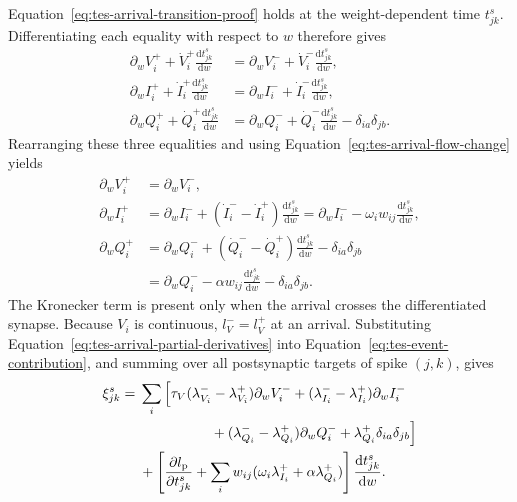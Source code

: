 Equation~\eqref{eq:tes-arrival-transition-proof} holds at the weight-dependent
time $t^s_{jk}$. Differentiating each equality with respect to $w$ therefore
gives
\begin{align}
    \partial_wV_i^+
      +\dot V_i^+\frac{\mathrm dt^s_{jk}}{\mathrm dw}
      &=
      \partial_wV_i^-
      +\dot V_i^-\frac{\mathrm dt^s_{jk}}{\mathrm dw},
      \label{eq:tes-arrival-differentiate-v}\\
    \partial_wI_i^+
      +\dot I_i^+\frac{\mathrm dt^s_{jk}}{\mathrm dw}
      &=
      \partial_wI_i^-
      +\dot I_i^-\frac{\mathrm dt^s_{jk}}{\mathrm dw},
      \label{eq:tes-arrival-differentiate-i}\\
    \partial_wQ_i^+
      +\dot Q_i^+\frac{\mathrm dt^s_{jk}}{\mathrm dw}
      &=
      \partial_wQ_i^-
      +\dot Q_i^-\frac{\mathrm dt^s_{jk}}{\mathrm dw}
      -\delta_{ia}\delta_{jb}.
      \label{eq:tes-arrival-differentiate-q}
\end{align}
Rearranging these three equalities and using
Equation~\eqref{eq:tes-arrival-flow-change} yields
\begin{align}
    \partial_wV_i^+
      &=\partial_wV_i^-,
      \nonumber\\
    \partial_wI_i^+
      &=\partial_wI_i^-
        +(\dot I_i^- -\dot I_i^+)
          \frac{\mathrm dt^s_{jk}}{\mathrm dw}
       =\partial_wI_i^-
        -\omega_iw_{ij}\frac{\mathrm dt^s_{jk}}{\mathrm dw},
      \nonumber\\
    \partial_wQ_i^+
      &=\partial_wQ_i^-
        +(\dot Q_i^- -\dot Q_i^+)
          \frac{\mathrm dt^s_{jk}}{\mathrm dw}
        -\delta_{ia}\delta_{jb}
      \nonumber\\
      &=\partial_wQ_i^-
        -\alpha w_{ij}\frac{\mathrm dt^s_{jk}}{\mathrm dw}
        -\delta_{ia}\delta_{jb}.
    \label{eq:tes-arrival-partial-derivatives}
\end{align}
The Kronecker term is present only when the arrival crosses the differentiated
synapse. Because $V_i$ is continuous, $l_V^-=l_V^+$ at an arrival.
Substituting Equation~\eqref{eq:tes-arrival-partial-derivatives} into
Equation~\eqref{eq:tes-event-contribution}, and summing over all postsynaptic
targets of spike $(j,k)$, gives
\begin{align}
    \xi^s_{jk}
    ={}&\sum_i\Big[
       \tau_V(\lambda_{V_i}^- -\lambda_{V_i}^+)\partial_wV_i^-
       +(\lambda_{I_i}^- -\lambda_{I_i}^+)\partial_wI_i^-
       \nonumber\\
    &\hspace{18mm}
       +(\lambda_{Q_i}^- -\lambda_{Q_i}^+)\partial_wQ_i^-
       +\lambda_{Q_i}^+\delta_{ia}\delta_{jb}
       \Big]
       \nonumber\\
    &+\left[
       \frac{\partial l_{\mathrm p}}{\partial t^s_{jk}}
       +\sum_iw_{ij}
        (\omega_i\lambda_{I_i}^+
         +\alpha\lambda_{Q_i}^+)
       \right]\frac{\mathrm dt^s_{jk}}{\mathrm dw}.
    \label{eq:tes-arrival-boundary-expansion}
\end{align}
